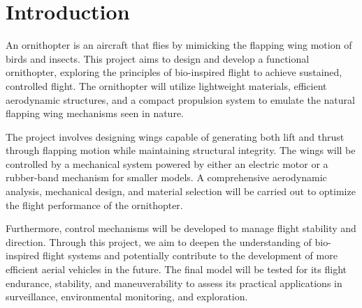 \chapter{Introduction}

An ornithopter is an aircraft that flies by mimicking the flapping wing motion of birds and insects. This project aims to design and develop a functional ornithopter, exploring the principles of bio-inspired flight to achieve sustained, controlled flight. The ornithopter will utilize lightweight materials, efficient aerodynamic structures, and a compact propulsion system to emulate the natural flapping wing mechanisms seen in nature. 

The project involves designing wings capable of generating both lift and thrust through flapping motion while maintaining structural integrity. The wings will be controlled by a mechanical system powered by either an electric motor or a rubber-band mechanism for smaller models. A comprehensive aerodynamic analysis, mechanical design, and material selection will be carried out to optimize the flight performance of the ornithopter. 

Furthermore, control mechanisms will be developed to manage flight stability and direction. Through this project, we aim to deepen the understanding of bio-inspired flight systems and potentially contribute to the development of more efficient aerial vehicles in the future. The final model will be tested for its flight endurance, stability, and maneuverability to assess its practical applications in surveillance, environmental monitoring, and exploration.